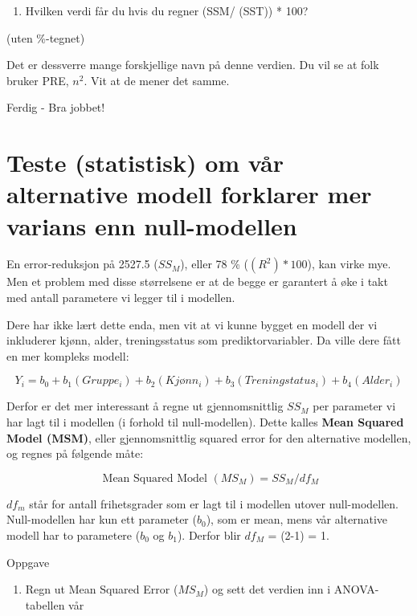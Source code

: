 \documentclass[
]{book}
\providecommand{\tightlist}{%
  \setlength{\itemsep}{0pt}\setlength{\parskip}{0pt}}
\begin{document}
\begin{enumerate}
\def\labelenumi{\alph{enumi}.}
\setcounter{enumi}{4}
\tightlist
\item
  Hvilken verdi får du hvis du regner (SSM/ (SST)) * 100?
\end{enumerate}

(uten \%-tegnet)

Det er dessverre mange forskjellige navn på denne verdien. Du vil se at folk bruker PRE, \(n^2\). Vit at de mener det samme.

{Ferdig - Bra jobbet!}

\hypertarget{teste-statistisk-om-vuxe5r-alternative-modell-forklarer-mer-varians-enn-null-modellen}{%
\section{Teste (statistisk) om vår alternative modell forklarer mer varians enn null-modellen}\label{teste-statistisk-om-vuxe5r-alternative-modell-forklarer-mer-varians-enn-null-modellen}}

En error-reduksjon på 2527.5 (\(SS_M\)), eller 78 \% (\((R^2)*100\)), kan virke mye. Men et problem med disse størrelsene er at de begge er garantert å øke i takt med antall parametere vi legger til i modellen.

Dere har ikke lært dette enda, men vit at vi kunne bygget en modell der vi inkluderer kjønn, alder, treningsstatus som prediktorvariabler. Da ville dere fått en mer kompleks modell:

\[
Y_i  = b_0 + b_1(Gruppe_i) + b_2(Kjønn_i) + b_3(Treningstatus_i) + b_4(Alder_i)
\]

Derfor er det mer interessant å regne ut gjennomsnittlig \(SS_M\) per parameter vi har lagt til i modellen (i forhold til null-modellen). Dette kalles \textbf{Mean Squared Model (MSM)}, eller gjennomsnittlig squared error for den alternative modellen, og regnes på følgende måte:

\[
\text{ Mean Squared Model } (MS_M) = SS_M / df_M
\]

\(df_m\) står for antall frihetsgrader som er lagt til i modellen utover null-modellen. Null-modellen har kun ett parameter (\(b_0\)), som er mean, mens vår alternative modell har to parametere (\(b_0\) og \(b_1\)). Derfor blir \(df_M\) = (2-1) = 1.

{Oppgave}

\begin{enumerate}
\def\labelenumi{\alph{enumi}.}
\tightlist
\item
  Regn ut Mean Squared Error (\(MS_M\)) og sett det verdien inn i ANOVA-tabellen vår
\end{enumerate}
\end{document}
